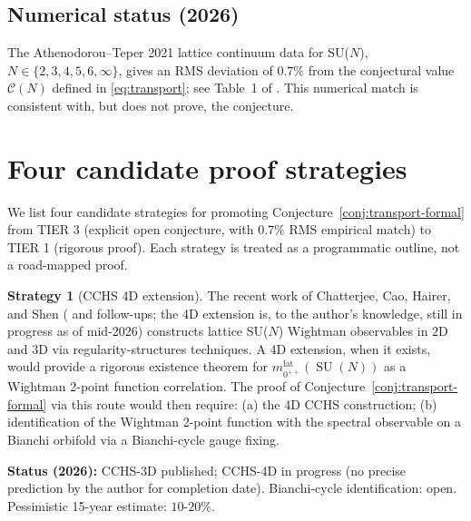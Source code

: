 \documentclass[11pt,a4paper,reqno]{amsart}
\theoremstyle{definition}
\newtheorem{strategy}{Strategy}
\DeclareMathOperator{\SU}{SU}
\begin{document}
\subsection{Numerical status (2026)}\label{ss:numeric}

The Athenodorou--Teper 2021 lattice continuum data \cite[Tab.~34]{AthenodorouTeper2021} for SU($N$), $N\in\{2,3,4,5,6,\infty\}$, gives an RMS deviation of $0.7\%$ from the conjectural value $\mathcal{C}(N)$ defined in \eqref{eq:transport}; see Table~1 of \cite{Remondiere2026RouteB}. This numerical match is consistent with, but does not prove, the conjecture.

\section{Four candidate proof strategies}\label{sec:strategies}

We list four candidate strategies for promoting Conjecture~\ref{conj:transport-formal} from TIER 3 (explicit open conjecture, with $0.7\%$ RMS empirical match) to TIER 1 (rigorous proof). Each strategy is treated as a programmatic outline, not a road-mapped proof.

\begin{strategy}[CCHS 4D extension]\label{strat:CCHS}
The recent work of Chatterjee, Cao, Hairer, and Shen (\cite{Chatterjee2020} and follow-ups; the 4D extension is, to the author's knowledge, still in progress as of mid-2026) constructs lattice SU($N$) Wightman observables in $2$D and $3$D via regularity-structures techniques. A 4D extension, when it exists, would provide a rigorous existence theorem for $m_{0^{++}}^{\mathrm{lat}}(\SU(N))$ as a Wightman 2-point function correlation. The proof of Conjecture~\ref{conj:transport-formal} via this route would then require: (a) the 4D CCHS construction; (b) identification of the Wightman 2-point function with the spectral observable on a Bianchi orbifold via a Bianchi-cycle gauge fixing.

\textbf{Status (2026):} CCHS-3D published; CCHS-4D in progress (no precise prediction by the author for completion date). Bianchi-cycle identification: open. Pessimistic 15-year estimate: $10$-$20\%$.
\end{strategy}
\end{document}
